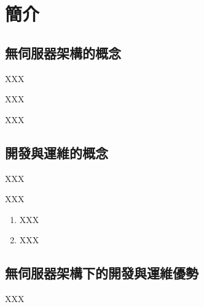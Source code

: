 \setcounter{chapter}{0}
\chapter{簡介}
\setcounter{page}{1}  %
\renewcommand{\baselinestretch}{10} %
\section{無伺服器架構的概念}
\par
\renewcommand{\baselinestretch}{1} %
\twelve XXX\\
\par
\renewcommand{\baselinestretch}{1} %
\twelve XXX\\
\par
\renewcommand{\baselinestretch}{1} %
\twelve XXX
\par

\renewcommand{\baselinestretch}{20} %
\section{開發與運維的概念}
\par
\renewcommand{\baselinestretch}{1} %
\twelve XXX\\
\par
\renewcommand{\baselinestretch}{1} %
\twelve XXX
\begin{enumerate}
	\item XXX
	\item XXX
\end{enumerate}
\par

\renewcommand{\baselinestretch}{20} %
\section{無伺服器架構下的開發與運維優勢}
\par
\renewcommand{\baselinestretch}{1} %
\twelve XXX
\par
